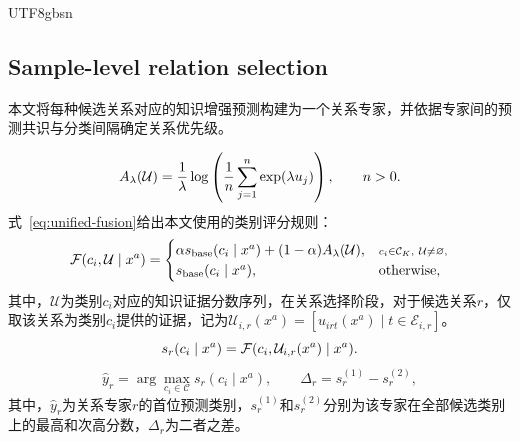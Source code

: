 \begin{CJK*}{UTF8}{gbsn}
\subsection{Sample-level relation selection}\label{sec:relation-selector-method}

本文将每种候选关系对应的知识增强预测构建为一个关系专家，并依据专家间的预测共识与分类间隔确定关系优先级。

\begin{equation}
A_{\lambda}(\mathcal U)=\frac{1}{\lambda}\log\left(\frac{1}{n}\sum_{j=1}^{n}\exp(\lambda u_j)\right),\qquad n>0.
\label{eq:normlse}
\end{equation}
式~\eqref{eq:unified-fusion}给出本文使用的类别评分规则：
\begin{equation}
\mathcal F(c_i,\mathcal U\mid x^a)=
\begin{cases}
\alpha s_{\mathrm{base}}(c_i\mid x^a)+(1-\alpha)A_{\lambda}(\mathcal U),
&\scriptstyle c_i\in\mathcal C_K,\ \mathcal U\neq\varnothing,\\
s_{\mathrm{base}}(c_i\mid x^a),&\text{otherwise},
\end{cases}
\label{eq:unified-fusion}
\end{equation}
其中，$\mathcal U$为类别$c_i$对应的知识证据分数序列，在关系选择阶段，对于候选关系$r$，仅取该关系为类别$c_i$提供的证据，记为$\mathcal U_{i,r}(x^a)=[u_{irt}(x^a)\mid t\in\mathcal E_{i,r}]$。
\[
s_r(c_i\mid x^a)=\mathcal F(c_i,\mathcal U_{i,r}(x^a)\mid x^a).
\]
\begin{equation}
\hat y_r=\arg\max_{c_i\in\mathcal C}s_r(c_i\mid x^a),\qquad \Delta_r=s_r^{(1)}-s_r^{(2)},
\label{eq:expert-margin}
\end{equation}
其中，$\hat y_r$为关系专家$r$的首位预测类别，$s_r^{(1)}$和$s_r^{(2)}$分别为该专家在全部候选类别上的最高和次高分数，$\Delta_r$为二者之差。


\end{CJK*}
